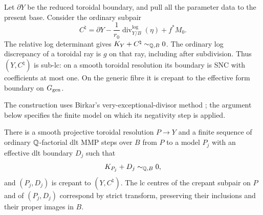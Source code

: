 Let $\partial Y$ be the reduced toroidal boundary, and pull all the
parameter data to the present base.  Consider the ordinary subpair
\begin{equation}\label{inc:subpair}
 C^\natural=\partial Y-
 \frac{1}{r_0}\operatorname{div}^{\log}_{Y/B}(\eta)+f^*M_0.
\end{equation}
The relative log determinant gives
$K_Y+C^\natural\sim_{\mathbb Q,B}0$.  The ordinary log discrepancy of a
toroidal ray is $g$ on that ray, including after subdivision.  Thus
$(Y,C^\natural)$ is sub-lc: on a smooth toroidal resolution its boundary
is SNC with coefficients at most one.  On the generic fibre it is
crepant to the effective form boundary on $G_{\rm gen}$.

The construction uses Birkar's very-exceptional-divisor method
\cite[Section~3 and Theorem~3.4]{BirkarFlips}; the argument below
specifies the finite model on which its negativity step is applied.

\begin{lemma}\label{inc:effective-model}
There is a smooth projective toroidal resolution $P\to Y$ and a finite
sequence of ordinary $\mathbb Q$-factorial dlt MMP steps over $B$ from $P$ to a
model $P_j$ with an effective dlt boundary $D_j$ such that
\[
 K_{P_j}+D_j\sim_{\mathbb Q,B}0,
\]
and $(P_j,D_j)$ is crepant to $(Y,C^\natural)$.  The lc centres of the
crepant subpair on $P$ and of $(P_j,D_j)$ correspond by strict transform,
preserving their inclusions
and their proper images in $B$.
\end{lemma}

